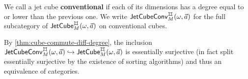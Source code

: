 \documentclass[a4paper]{memoir}
\begin{document}
\begin{definition} \label{def:conv-jet-cube-cat}
	We call a jet cube \textbf{conventional} if each of its dimensions has a degree equal to or lower than the previous one.
	We write $\convjetcube{\myorix}{\mycubex}{M}{\vec a}$ for the full subcategory of $\jetcube{\myorix}{\mycubex}{M}{\vec a}$ on conventional cubes.
\end{definition}
\begin{corollary} \label{thm:conv-jet-cube-cat}
	By \cref{thm:cube-commute-diff-degree}, the inclusion $\convjetcube{\myorix}{\mycubex}{M}{\vec a} \hookrightarrow \jetcube{\myorix}{\mycubex}{M}{\vec a}$ is essentially surjective (in fact split essentially surjective by the existence of sorting algorithms) and thus an equivalence of categories. \qedhere
\end{corollary}
\end{document}
